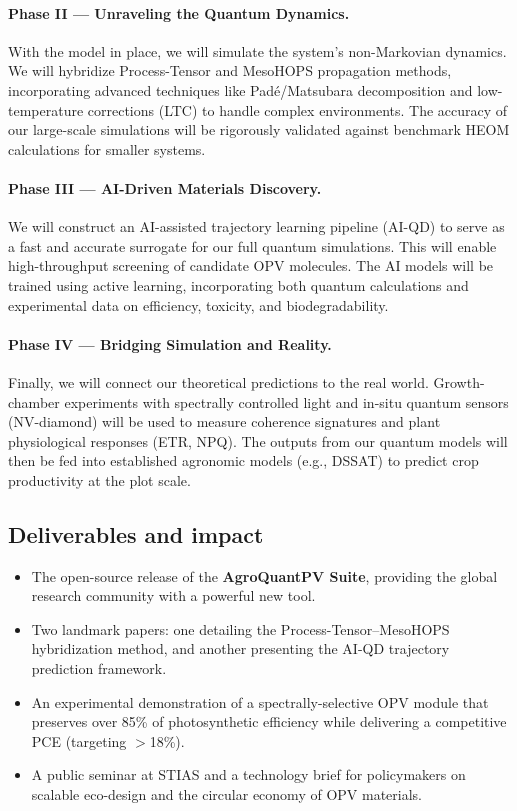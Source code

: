 \documentclass[11pt,a4paper]{article}
\begin{document}
\paragraph{Phase II — Unraveling the Quantum Dynamics.} With the model in place, we will simulate the system's non-Markovian dynamics. We will hybridize Process-Tensor and MesoHOPS propagation methods, incorporating advanced techniques like Padé/Matsubara decomposition and low-temperature corrections (LTC) to handle complex environments. The accuracy of our large-scale simulations will be rigorously validated against benchmark HEOM calculations for smaller systems.

\paragraph{Phase III — AI-Driven Materials Discovery.} We will construct an AI-assisted trajectory learning pipeline (AI-QD) to serve as a fast and accurate surrogate for our full quantum simulations. This will enable high-throughput screening of candidate OPV molecules. The AI models will be trained using active learning, incorporating both quantum calculations and experimental data on efficiency, toxicity, and biodegradability.

\paragraph{Phase IV — Bridging Simulation and Reality.} Finally, we will connect our theoretical predictions to the real world. Growth-chamber experiments with spectrally controlled light and in-situ quantum sensors (NV-diamond) will be used to measure coherence signatures and plant physiological responses (ETR, NPQ). The outputs from our quantum models will then be fed into established agronomic models (e.g., DSSAT) to predict crop productivity at the plot scale.

\subsection*{Deliverables and impact}

\begin{itemize}
  \item The open-source release of the \textbf{AgroQuantPV Suite}, providing the global research community with a powerful new tool.
  \item Two landmark papers: one detailing the Process-Tensor–MesoHOPS hybridization method, and another presenting the AI-QD trajectory prediction framework.
  \item An experimental demonstration of a spectrally-selective OPV module that preserves over 85\% of photosynthetic efficiency while delivering a competitive PCE (targeting $>$18\%).
  \item A public seminar at STIAS and a technology brief for policymakers on scalable eco-design and the circular economy of OPV materials.
\end{itemize}
\end{document}
